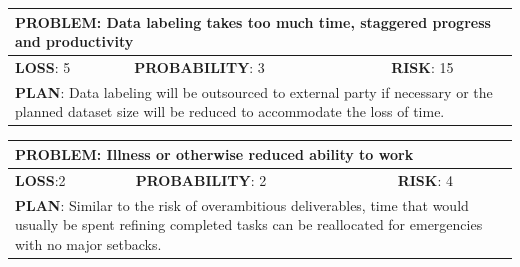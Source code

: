 \documentclass[a4paper,12pt]{article}
\begin{document}
\begin{tabular}{|l|l|l|}
\hline
\multicolumn{3}{|l|}{\parbox[t]{\textwidth-1.15cm}{\textbf{PROBLEM}: Data labeling takes too much time, staggered progress and productivity\vspace{.2\baselineskip}}} \\ \hline
\textbf{LOSS}: 5& \textbf{PROBABILITY}: 3&\textbf{RISK}: 15\\ \hline
\multicolumn{3}{|l|}{\parbox[t]{\textwidth-1.15cm}{\textbf{PLAN}: Data labeling will be outsourced to external party if necessary or the planned dataset size will be reduced to accommodate the loss of time.}} \\ \hline
\end{tabular}

\begin{tabular}{|l|l|l|}
\hline
\multicolumn{3}{|l|}{\parbox[t]{\textwidth-1.15cm}{\textbf{PROBLEM}: Illness or otherwise reduced ability to work}} \\ \hline
\textbf{LOSS}:2 & \textbf{PROBABILITY}: 2&\textbf{RISK}: 4\\ \hline
\multicolumn{3}{|l|}{\parbox[t]{\textwidth-1.15cm}{\textbf{PLAN}: Similar to the risk of overambitious deliverables, time that would usually be spent refining completed tasks can be reallocated for emergencies with no major setbacks.}} \\ \hline
\end{tabular}


\end{document}

